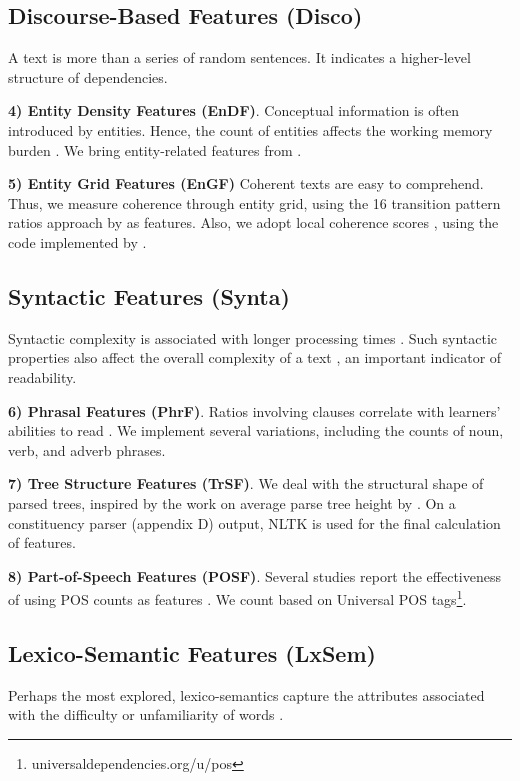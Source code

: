 \documentclass[11pt]{article}
\begin{document}
\subsection{Discourse-Based Features (Disco)}
A text is more than a series of random sentences. It indicates a higher-level structure of dependencies.

\textbf{4) Entity Density Features (EnDF)}. 
Conceptual information is often introduced by entities. Hence, the count of entities affects the working memory burden \citep{Feng:09}. We bring entity-related features from \citet{Feng:10}.

\textbf{5) Entity Grid Features (EnGF)} 
Coherent texts are easy to comprehend. Thus, we measure coherence through entity grid, using the 16 transition pattern ratios approach by \citet{Pitler:08} as features. Also, we adopt local coherence scores \citep{guinaudeau2013graph}, using the code implemented by \citet{palma2018coherence}. 

\subsection{Syntactic Features (Synta)}
Syntactic complexity is associated with longer processing times \citep{gibson1998linguistic}. Such syntactic properties also affect the overall complexity of a text \citep{hale2016information}, an important indicator of readability.

\textbf{6) Phrasal Features (PhrF)}. 
Ratios involving clauses correlate with learners' abilities to read \citep{lu2010automatic}. We implement several variations, including the counts of noun, verb, and adverb phrases.

\textbf{7) Tree Structure Features (TrSF)}. 
We deal with the structural shape of parsed trees, inspired by the work on average parse tree height by \citet{Schwarm}. On a constituency parser (appendix D) output, NLTK \citep{loper2002nltk} is used for the final calculation of features.

\textbf{8) Part-of-Speech Features (POSF)}. 
Several studies report the effectiveness of using POS counts as features \citep{tonelli2012making, Leeb:20}. We count based on Universal POS tags\footnote{universaldependencies.org/u/pos}.

\subsection{Lexico-Semantic Features (LxSem)}
Perhaps the most explored, lexico-semantics capture the attributes associated with the difficulty or unfamiliarity of words \citep{Collins-Thompson:14}. 
\end{document}
